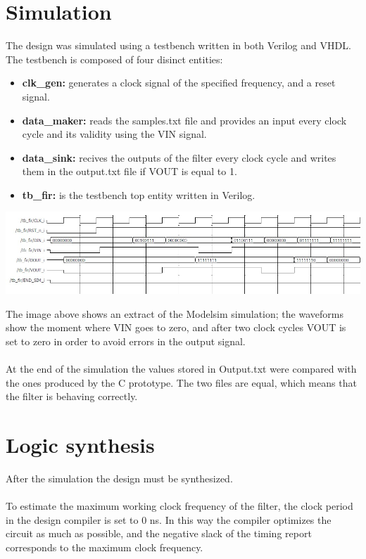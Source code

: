 \section{Simulation}

The design was simulated using a testbench written in both Verilog and VHDL. The testbench is composed of four disinct entities:

\begin{itemize}
    \item \textbf{clk\_gen:} generates a clock signal of the specified frequency, and a reset signal.
    \item \textbf{data\_maker:} reads the samples.txt file and provides an input every clock cycle and its validity using the VIN signal. 
    \item \textbf{data\_sink:} recives the outputs of the filter every clock cycle and writes them in the output.txt file if VOUT is equal to 1. 
    \item \textbf{tb\_fir:} is the testbench top entity written in Verilog.
\end{itemize}

\centerline{
\includegraphics[width=15.5cm]{./chapters/figures/waveform1.jpg}}

\vspace{5mm}
The image above shows an extract of the Modelsim simulation; the waveforms show the moment where VIN goes to zero, and after two clock cycles VOUT is set to zero
in order to avoid errors in the output signal.
\paragraph{}
At the end of the simulation the values stored in Output.txt were compared with the ones produced by the C prototype. The two files are equal, which
means that the filter is behaving correctly. 

\section{Logic synthesis}
After the simulation the design must be synthesized. 
\paragraph{}
To estimate the maximum working clock frequency of the filter,
the clock period in the design compiler is set to 0 ns. In this way the compiler optimizes the circuit as much as possible,
and the negative slack of the timing report corresponds to the maximum clock frequency. 

